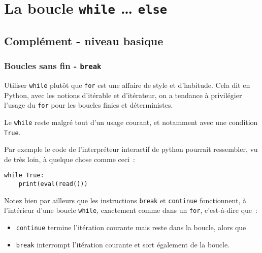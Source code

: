     
    
    
    

    

    \hypertarget{la-boucle-while-else}{%
\section{\texorpdfstring{La boucle \texttt{while} \ldots{}
\texttt{else}}{La boucle while \ldots{} else}}\label{la-boucle-while-else}}

    \hypertarget{compluxe9ment---niveau-basique}{%
\subsection{Complément - niveau
basique}\label{compluxe9ment---niveau-basique}}

    \hypertarget{boucles-sans-fin---break}{%
\subsubsection{\texorpdfstring{Boucles sans fin -
\texttt{break}}{Boucles sans fin - break}}\label{boucles-sans-fin---break}}

    Utiliser \texttt{while} plutôt que \texttt{for} est une affaire de style
et d'habitude. Cela dit en Python, avec les notions d'itérable et
d'itérateur, on a tendance à privilégier l'usage du \texttt{for} pour
les boucles finies et déterministes.

    Le \texttt{while} reste malgré tout d'un usage courant, et notamment
avec une condition \texttt{True}.

Par exemple le code de l'interpréteur interactif de python pourrait
ressembler, vu de très loin, à quelque chose comme ceci~:

\begin{verbatim}
while True:
    print(eval(read()))
\end{verbatim}

    Notez bien par ailleurs que les instructions \texttt{break} et
\texttt{continue} fonctionnent, à l'intérieur d'une boucle
\texttt{while}, exactement comme dans un \texttt{for}, c'est-à-dire
que~:

\begin{itemize}
\tightlist
\item
  \texttt{continue} termine l'itération courante mais reste dans la
  boucle, alors que
\item
  \texttt{break} interrompt l'itération courante et sort également de la
  boucle.
\end{itemize}


